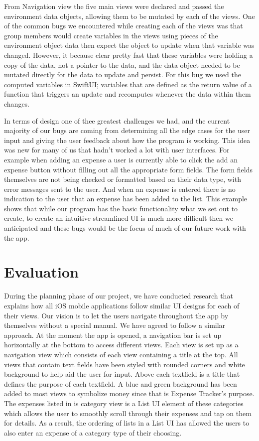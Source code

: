 \documentclass{article}
\begin{document}
  \vskip 0.2in 
  
From Navigation view the five main views were declared and passed the environment data objects, allowing them to be mutated by each of the views. One of the common bugs we encountered while creating each of the views was that group members would create variables in the views using pieces of the environment object data then expect the object to update when that variable was changed. However, it because clear pretty fast that these variables were holding a copy of the data, not a pointer to the data, and the data object needed to be mutated directly for the data to update and persist. For this bug we used the computed variables in SwiftUI; variables that are defined as the return value of a function that triggers an update and recomputes whenever the data within them changes. \par

  \vskip 0.2in 
 
 In terms of design one of thee greatest challenges we had, and the current majority of our bugs are coming from determining all the edge cases for the user input and giving the user feedback about how the program is working. This idea was new for many of us that hadn't worked a lot with user interfaces. For example when adding an expense a user is currently able to click the add an expense button without filling out all the appropriate form fields. The form fields themselves are not being checked or formatted based on their data type, with error messages sent to the user. And when an expense is entered there is no indication to the user that an expense has been added to the list. This example shows that while our program has the basic functionality what we set out to create, to create an intuitive streamlined UI is much more difficult then we anticipated and these bugs would be the focus of much of our future work with the app.
 


\section{Evaluation}
During the planning phase of our project, we have conducted research that explains how all iOS mobile applications follow similar UI designs for each of their views. Our vision is to let the users navigate throughout the app by themselves without a special manual. We have agreed to follow a similar approach. At the moment the app is opened, a navigation bar is set up horizontally at the bottom to access different views. Each view is set up as a navigation view which consists of each view containing a title at the top. All views that contain text fields have been styled with rounded corners and white background to help aid the user for input. Above each textfield is a title that defines the purpose of each textfield. A blue and green background has been added to most views to symbolize money since that is Expense Tracker’s purpose. The expenses listed in is category view is a List UI element of these categories which allows the user to smoothly scroll through their expenses and tap on them for details. As a result, the ordering of lists in a List UI has allowed the users to also enter an expense of a category type of their choosing.
\end{document}

